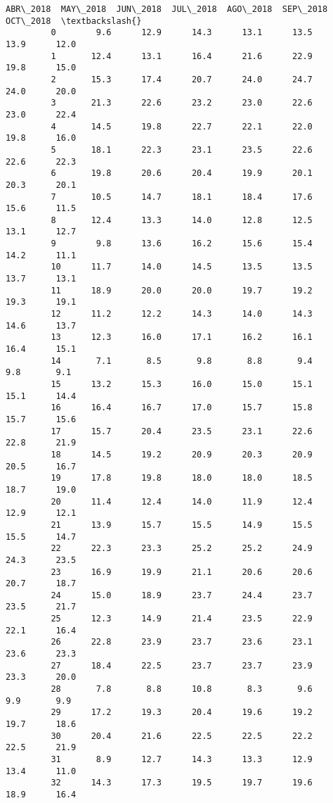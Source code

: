 \documentclass[11pt]{article}
\begin{document}
\begin{Verbatim}[commandchars=\\\{\}]
             ABR\_2018  MAY\_2018  JUN\_2018  JUL\_2018  AGO\_2018  SEP\_2018  OCT\_2018  \textbackslash{}
         0        9.6      12.9      14.3      13.1      13.5      13.9      12.0   
         1       12.4      13.1      16.4      21.6      22.9      19.8      15.0   
         2       15.3      17.4      20.7      24.0      24.7      24.0      20.0   
         3       21.3      22.6      23.2      23.0      22.6      23.0      22.4   
         4       14.5      19.8      22.7      22.1      22.0      19.8      16.0   
         5       18.1      22.3      23.1      23.5      22.6      22.6      22.3   
         6       19.8      20.6      20.4      19.9      20.1      20.3      20.1   
         7       10.5      14.7      18.1      18.4      17.6      15.6      11.5   
         8       12.4      13.3      14.0      12.8      12.5      13.1      12.7   
         9        9.8      13.6      16.2      15.6      15.4      14.2      11.1   
         10      11.7      14.0      14.5      13.5      13.5      13.7      13.1   
         11      18.9      20.0      20.0      19.7      19.2      19.3      19.1   
         12      11.2      12.2      14.3      14.0      14.3      14.6      13.7   
         13      12.3      16.0      17.1      16.2      16.1      16.4      15.1   
         14       7.1       8.5       9.8       8.8       9.4       9.8       9.1   
         15      13.2      15.3      16.0      15.0      15.1      15.1      14.4   
         16      16.4      16.7      17.0      15.7      15.8      15.7      15.6   
         17      15.7      20.4      23.5      23.1      22.6      22.8      21.9   
         18      14.5      19.2      20.9      20.3      20.9      20.5      16.7   
         19      17.8      19.8      18.0      18.0      18.5      18.7      19.0   
         20      11.4      12.4      14.0      11.9      12.4      12.9      12.1   
         21      13.9      15.7      15.5      14.9      15.5      15.5      14.7   
         22      22.3      23.3      25.2      25.2      24.9      24.3      23.5   
         23      16.9      19.9      21.1      20.6      20.6      20.7      18.7   
         24      15.0      18.9      23.7      24.4      23.7      23.5      21.7   
         25      12.3      14.9      21.4      23.5      22.9      22.1      16.4   
         26      22.8      23.9      23.7      23.6      23.1      23.6      23.3   
         27      18.4      22.5      23.7      23.7      23.9      23.3      20.0   
         28       7.8       8.8      10.8       8.3       9.6       9.9       9.9   
         29      17.2      19.3      20.4      19.6      19.2      19.7      18.6   
         30      20.4      21.6      22.5      22.5      22.2      22.5      21.9   
         31       8.9      12.7      14.3      13.3      12.9      13.4      11.0   
         32      14.3      17.3      19.5      19.7      19.6      18.9      16.4   
         

\end{Verbatim}
\end{document}
